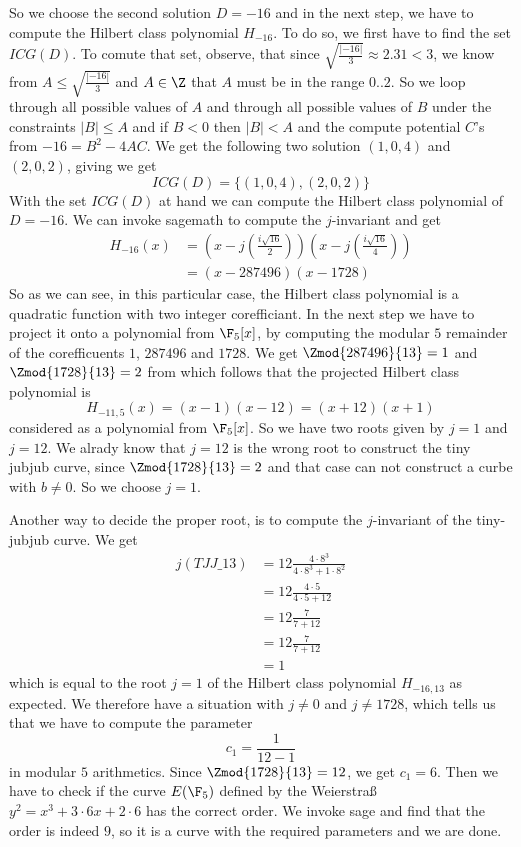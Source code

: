 \begin{example}
So we choose the second solution $D=-16$ and in the next step, we have to compute the Hilbert class polynomial $H_{-16}$. To do so, we first have to find the set $ICG(D)$. To comute that set, observe, that since $\sqrt{\frac{|-16|}{3}}\approx 2.31<3$, we know from $A\leq \sqrt{\frac{|-16|}{3}}$ and $A\in\Z$ that $A$ must be in the range $0..2$. So we loop through all possible values of $A$ and through all possible values of $B$ under the constraints $|B|\leq A$ and if $B<0$ then $|B|<A$
and the compute potential $C$'s from $-16 = B^2 -4AC$. We get the following two solution $(1,0,4)$ and $(2,0,2)$, giving  
we get
$$
ICG(D)=\{(1,0,4),(2,0,2)\}
$$
With the set $ICG(D)$ at hand we can compute the Hilbert class polynomial of $D=-16$. We can invoke sagemath to compute the $j$-invariant and get 
\begin{align*}
H_{-16}(x) &= \left(x - j\left(\frac{i\sqrt{16}}{2}\right)\right)
 \left(x - j\left(\frac{i\sqrt{16}}{4}\right)\right) \\
           &= (x- 287496)(x-1728)
\end{align*}
So as we can see, in this particular case, the Hilbert class polynomial is a quadratic function with two integer corefficiant. In the next step we have to project it onto a polynomial from $\F_5[x]$, by computing the modular $5$ remainder of the corefficuents $1$, $287496$ and $1728$. We get $\Zmod{287496}{13}=1$ and $\Zmod{1728}{13}=2$ from which follows that the projected Hilbert class polynomial is  
$$
H_{-11,5}(x)=(x-1)(x-12)= (x+12)(x+1)
$$ 
considered as a polynomial from $\F_5[x]$. So we have two roots given by $j=1$ and $j=12$. We alrady know that $j=12$ is the wrong root to construct the tiny jubjub curve, since $\Zmod{1728}{13}=2$ and that case can not construct a curbe with $b\neq 0$. So we choose $j=1$.

Another way to decide the proper root, is to compute the $j$-invariant of the tiny-jubjub curve. We get
\begin{align*}
j(\mathit{TJJ\_13}) & = 12\frac{4\cdot 8^3}{4\cdot 8^3+ 1\cdot 8^2}\\
                    & = 12\frac{4\cdot 5}{4\cdot 5+ 12}\\
                    & = 12\frac{7}{7+ 12}\\
                    & = 12\frac{7}{7+ 12}\\
                    & = 1
\end{align*}
which is equal to the root $j=1$ of the Hilbert class polynomial $H_{-16,13}$ as expected. We therefore have a situation with $j\neq 0$ and $j\neq 1728$, which tells us that we have to compute the parameter
$$
c_1=\frac{1}{12-1}
$$
in modular $5$ arithmetics. Since $\Zmod{1728}{13}=12$, we get $c_1=6$. Then we have to check if the curve $E(\F_5)$ defined by the Weierstraß  $y^2 = x^3 + 3\cdot 6 x + 2\cdot 6$ has the correct order. We invoke sage and find that the order is indeed $9$, so it is a curve with the required parameters and we are done.


\end{example}
